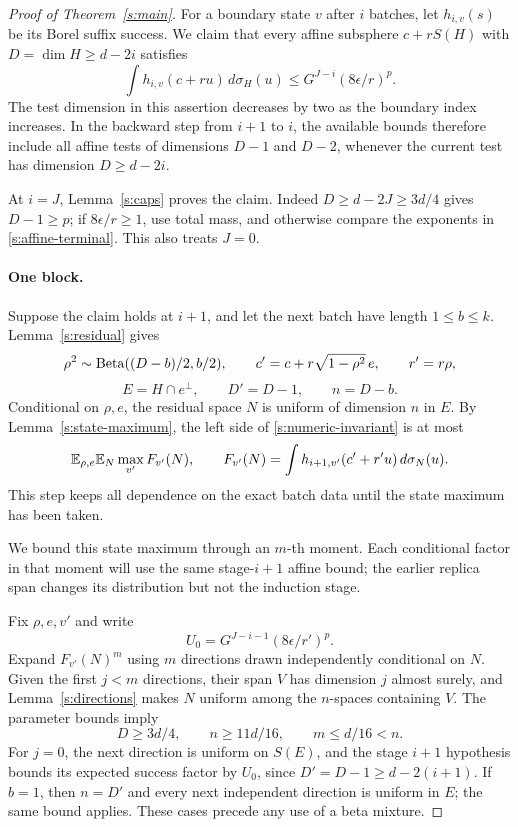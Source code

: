 \begin{proof}[Proof of Theorem~\ref{s:main}]
For a boundary state \(v\) after \(i\) batches, let \(h_{i,v}(s)\)
be its Borel suffix success. We claim that every affine subsphere
\(c+rS(H)\) with \(D=\dim H\ge d-2i\) satisfies
\begin{equation}\label{s:numeric-invariant}
 \int h_{i,v}(c+ru)\,d\sigma_H(u)
 \le G^{J-i}(8\epsilon/r)^p.
\end{equation}
The test dimension in this assertion decreases by two as the
boundary index increases. In the backward step from \(i+1\) to
\(i\), the available bounds therefore include all affine tests of
dimensions \(D-1\) and \(D-2\), whenever the current test has
dimension \(D\ge d-2i\).

At \(i=J\), Lemma~\ref{s:caps} proves the claim. Indeed
\(D\ge d-2J\ge3d/4\) gives \(D-1\ge p\); if
\(8\epsilon/r\ge1\), use total mass, and otherwise compare the
exponents in \eqref{s:affine-terminal}. This also treats \(J=0\).

\paragraph{One block.}
Suppose the claim holds at \(i+1\), and let the next batch have length
\(1\le b\le k\). Lemma~\ref{s:residual} gives
\[
 \rho^2\sim\operatorname{Beta}((D-b)/2,b/2),\qquad
 c'=c+r\sqrt{1-\rho^2}\,e,\qquad r'=r\rho,
\]
\[
 E=H\cap e^\perp,\qquad D'=D-1,\qquad n=D-b.
\]
Conditional on \(\rho,e\), the residual space \(N\) is uniform of
dimension \(n\) in \(E\). By Lemma~\ref{s:state-maximum}, the
left side of \eqref{s:numeric-invariant} is at most
\begin{equation}\label{s:numeric-max}
 \mathbb E_{\rho,e}\mathbb E_N\max_{v'}F_{v'}(N),\qquad
 F_{v'}(N)=\int h_{i+1,v'}(c'+r'u)\,d\sigma_N(u).
\end{equation}
This step keeps all dependence on the exact batch data until the state
maximum has been taken.

We bound this state maximum through an \(m\)-th moment. Each
conditional factor in that moment will use the same stage-\(i+1\)
affine bound; the earlier replica span changes its distribution but
not the induction stage.

Fix \(\rho,e,v'\) and write
\[
 U_0=G^{J-i-1}(8\epsilon/r')^p.
\]
Expand \(F_{v'}(N)^m\) using \(m\) directions drawn independently
conditional on \(N\). Given the first \(j<m\) directions, their
span \(V\) has dimension \(j\) almost surely, and
Lemma~\ref{s:directions} makes \(N\) uniform among the \(n\)-spaces
containing \(V\). The parameter bounds imply
\[
 D\ge3d/4,\qquad n\ge11d/16,\qquad m\le d/16<n.
\]
For \(j=0\), the next direction is uniform on \(S(E)\), and
the stage \(i+1\) hypothesis bounds its expected success factor by
\(U_0\), since \(D'=D-1\ge d-2(i+1)\). If \(b=1\), then
\(n=D'\) and every next independent direction is uniform in \(E\);
the same bound applies. These cases precede any use of a beta mixture.


\end{proof}
